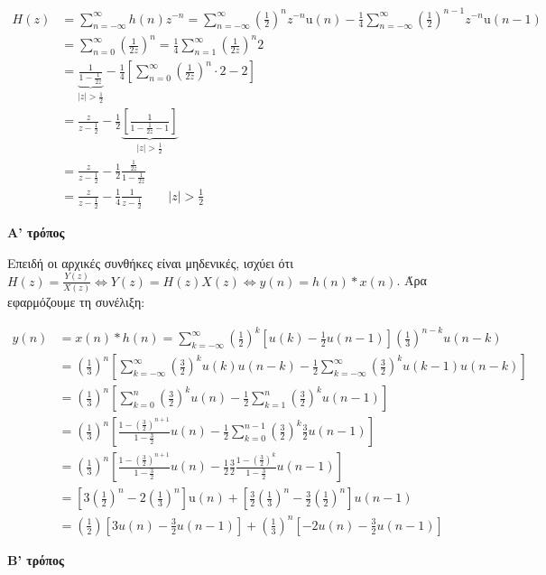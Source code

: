 \documentclass[11pt,a4paper,notitlepage,fleqn]{article}
\begin{document}
\begin{exercise}
\begin{enumpar}
	\begin{align*}
		H(z) &= \sum_{n=-\infty}^{\infty} h(n)z^{-n} = \sum_{n=-\infty}^{\infty}\left(\frac{1}{2}\right)^n z^{-n}\mathrm{u}(n)
		-\frac{1}{4}\sum_{n=-\infty}^{\infty}\left(\frac{1}{2}\right)^{n-1}z^{-n}\mathrm{u}(n-1)
		\\ &= \sum_{n=0}^{\infty} \left(\frac{1}{2z}\right)^n = \frac{1}{4}\sum_{n=1}^{\infty}\left(\frac{1}{2z}\right)^n 2
		\\ &= \underbrace{\frac{1}{1-\frac{1}{2z}}}_{|z|>\frac{1}{2}}
		- \frac{1}{4}\left[\sum_{n=0}^{\infty} \left(\frac{1}{2z}\right)^n \cdot 2 - 2 \right]
		\\ &= \frac{z}{z-\frac{1}{2}}-\frac{1}{2}\underbrace{\left[
		\frac{1}{1-\frac{1}{2z}-1}
		\right]}_{|z|>\frac{1}{2}}
        \\ &= \frac{z}{z-\frac{1}{2}} -\frac{1}{2}\frac{\frac{1}{2z}}{1-\frac{1}{2z}}
        \\ &
        =\frac{z}{z-\frac{1}{2}} - \frac{1}{4}\frac{1}{z-\frac{1}{2}}\qquad |z|>\frac{1}{2}
	\end{align*}
	
    \item
	\begin{enumgreekpar}
	\item \textbf{Α' τρόπος}
	
	
	Επειδή οι αρχικές συνθήκες είναι μηδενικές, ισχύει ότι \( H(z) = \frac{Y(z)}{X(z)}\iff
	Y(z) = H(z)X(z) \iff y(n) = h(n)*x(n) \). Άρα εφαρμόζουμε τη συνέλιξη:
	
	\begin{align*}
		y(n) &= x(n) * h(n) = \sum_{k=-\infty}^{\infty}\left(\frac{1}{2}\right)^k\left[
		u(k) - \frac{1}{2}u(n-1)
		\right]\left(\frac{1}{3}\right)^{n-k}u(n-k)
		\\ &= \left(\frac{1}{3}\right)^n\left[
		\sum_{k=-\infty}^{\infty} \left(\frac{3}{2}\right)^k u(k)u(n-k) - \frac{1}{2}\sum_{k=-\infty}^{\infty}\left(\frac{3}{2}\right)^k u(k-1)u(n-k)
		\right]
		\\ &= \left(\frac{1}{3}\right)^n \left[\sum_{k=0}^{n}\left(\frac{3}{2}\right)^k u(n)
		-\frac{1}{2}\sum_{k=1}^{n}\left(\frac{3}{2}\right)^k u(n-1)\right]
		\\ &= \left(\frac{1}{3}\right)^n\left[
		\frac{1-\left(\frac{3}{2}\right)^{n+1}}{1-\frac{3}{2}}u(n)
		-\frac{1}{2}\sum_{k=0}^{n-1}\left(\frac{3}{2}\right)^k \frac{3}{2}u(n-1)
		\right]
		\\ &= \left(\frac{1}{3}\right)^n\left[
		\frac{1-\left(\frac{3}{2}\right)^{n+1}}{1-\frac{3}{2}}u(n)
		-\frac{1}{2}\frac{3}{2}\frac{1-\left(\frac{3}{2}\right)^k}{1-\frac{3}{2}}u(n-1)
		\right]
		\\ &= \left[3\left(\frac{1}{2}\right)^n - 2\left(\frac{1}{3}\right)^n\right]\mathrm{u}(n)
		+\left[\frac{3}{2}\left(\frac{1}{3}\right)^n-\frac{3}{2}\left(\frac{1}{2}\right)^n\right]u(n-1)
		\\ &= \left(\frac{1}{2}\right)\left[3u(n)-\frac{3}{2}u(n-1)\right]
		+ \left(\frac{1}{3}\right)^n \left[ -2u(n)-\frac{3}{2}u(n-1) \right]
	\end{align*}
	\item \textbf{Β' τρόπος}
	

\end{enumgreekpar}
\end{enumpar}
\end{exercise}
\end{document}
